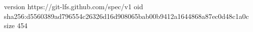 version https://git-lfs.github.com/spec/v1
oid sha256:d5560389ad796554c26326d16d908065bab00b9412a1644868a87ec0d48c1a0c
size 454
